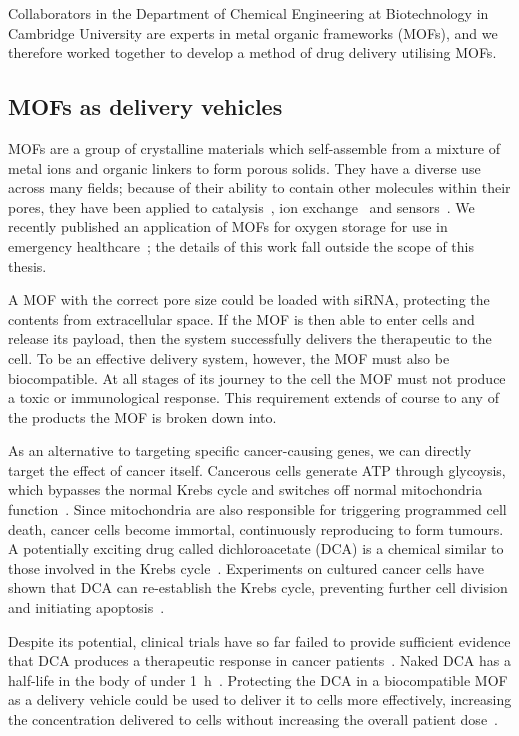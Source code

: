 Collaborators in the Department of Chemical Engineering at Biotechnology in Cambridge University are experts in metal organic frameworks (MOFs), and we therefore worked together to develop a method of drug delivery utilising MOFs.


\subsection{MOFs as delivery vehicles}
MOFs are a group of crystalline materials which self-assemble from a mixture of metal ions and organic linkers to form porous solids. 
They have a diverse use across many fields; because of their ability to contain other molecules within their pores, they have been applied to catalysis~\cite{ma2009enantioselective, farrusseng2011metal}, ion exchange~\cite{custelcean2007anion, fei2010reversible} and sensors~\cite{kreno2011metal, miller2016metal}. 
We recently published an application of MOFs for oxygen storage for use in emergency healthcare~\cite{moghadam2018computer}; the details of this work fall outside the scope of this thesis. 

A MOF with the correct pore size could be loaded with siRNA, protecting the contents from extracellular space. 
If the MOF is then able to enter cells and release its payload, then the system successfully delivers the therapeutic to the cell. 
To be an effective delivery system, however, the MOF must also be biocompatible.
At all stages of its journey to the cell the MOF must not produce a toxic or immunological response. 
This requirement extends of course to any of the products the MOF is broken down into. 

As an alternative to targeting specific cancer-causing genes, we can directly target the effect of cancer itself. 
Cancerous cells generate ATP through glycoysis, which bypasses the normal Krebs cycle and switches off normal mitochondria function~\cite{warburg1930uber, murray1993cell}. 
Since mitochondria are also responsible for triggering programmed cell death, cancer cells become immortal, continuously reproducing to form tumours. 
A potentially exciting drug called dichloroacetate (DCA) is a chemical similar to those involved in the Krebs cycle~\cite{michelakis2008dichloroacetate, matsuhashi2015activation}. 
Experiments on cultured cancer cells have shown that DCA can re-establish the Krebs cycle, preventing further cell division and initiating apoptosis~\cite{bonnet2007mitochondria}. 

Despite its potential, clinical trials have so far failed to provide sufficient evidence that DCA produces a therapeutic response in cancer patients~\cite{michelakis2010metabolic}. 
Naked DCA has a half-life in the body of under \SI{1}{\hour}~\cite{michelakis2008dichloroacetate}. 
Protecting the DCA in a biocompatible MOF as a delivery vehicle could be used to deliver it to cells more effectively, increasing the concentration delivered to cells without increasing the overall patient dose~\cite{abanades2018mechanistic}. 

